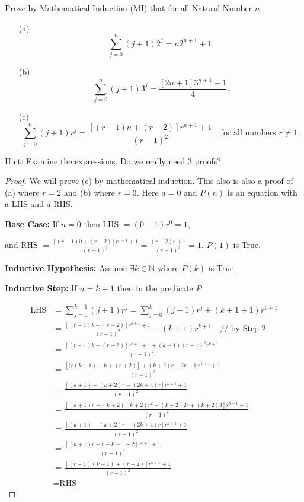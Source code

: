 \documentclass[
	12pt, %
	fleqn, %
	a4paper, %
]{LegrandOrangeBook}
\begin{document}
\begin{exercise}
    Prove by Mathematical Induction (MI) that for all Natural Number \( n  \),

\begin{enumerate}
    \item[(a)]
    \[ \sum_{j=0}^{n} (j + 1)2^j = n2^{n+1} + 1. \]
    \item[(b)]
    \[ \sum_{j=0}^{n} (j + 1)3^j = \frac{[2n + 1]3^{n+1} + 1}{4}. \]
    \item[(c)]
    \[ \sum_{j=0}^{n} (j + 1)r^j = \frac{[(r - 1)n + (r - 2)]r^{n+1} + 1}{(r - 1)^2} \quad \text{for all numbers } r \neq 1. \]
\end{enumerate}
\end{exercise}
Hint: Examine the expressions. Do we really need 3 proofs?
\begin{proof}
    We will prove (c) by mathematical induction. This also is also a proof of (a) where \( r = 2 \) and (b) where \( r = 3 \). Here \( a = 0 \) and \( P(n) \) is an equation with a LHS and a RHS.

\textbf{Base Case:} If \( n = 0 \) then LHS \( = (0 + 1)r^0 = 1 \),

and RHS \( = \frac{[(r - 1)0 + (r - 2)]r^{0+1} + 1}{(r - 1)^2} = \frac{(r - 2)r + 1}{(r - 1)^2} = 1 \). \( P(1) \) is True.

\textbf{Inductive Hypothesis:} Assume \( \exists k \in \mathbb{N} \) where \( P(k) \) is True.

\textbf{Inductive Step:} If \( n = k + 1 \) then in the predicate \( P \)

\begin{align*}
\text{LHS} &= \sum_{j=0}^{k+1} (j + 1)r^j = \sum_{j=0}^{k} (j + 1)r^j + (k + 1 + 1)r^{k+1} \\
&= \frac{[(r - 1)k + (r - 2)]r^{k+1} + 1}{(r - 1)^2} + (k + 1)r^{k+1} \quad \text{// by Step 2} \\
&= \frac{[(r - 1)k + (r - 2)]r^{k+1} + 1 + (k + 1)(r - 1)^2 r^{k+1}}{(r - 1)^2} \\
&= \frac{[(r(k + 1) - k + (r + 2)] + (k + 2)r - 2r + 1]r^{k+1} + 1}{(r - 1)^2} \\
&= \frac{[(k + 1) + (k + 2)r - (2k + 4)r]r^{k+1} + 1}{(r - 1)^2} \\
&= \frac{[(k + 1)r + (k + 2)(k + 2)r^2 - (k + 2)2r + (k + 2)3]r^{k+1} + 1}{(r - 1)^2} \\
&= \frac{[(k + 1) + (k + 2)r - (2k + 4)r]r^{k+1} + 1}{(r - 1)^2} \\
&= \frac{[(k + 1)r + r - k - 1 - 2]r^{k+1} + 1}{(r - 1)^2} \\
&= \frac{[(r - 1)(k + 1) + (r - 2)]r^{k+1} + 1}{(r - 1)^2} \\
&= \text{RHS} 
\end{align*}


\end{proof}
\end{document}
